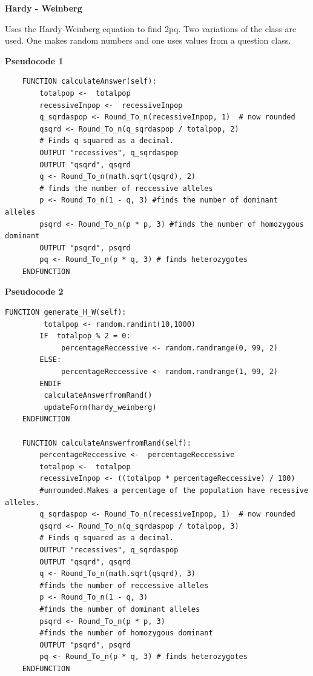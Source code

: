 \documentclass[a4paper,12pt]{report}
\begin{document}
\bigskip
\begin{flushleft}
\textbf{Hardy - Weinberg}

Uses the Hardy-Weinberg equation to find 2pq. Two variations of the class are used. One makes random numbers and one uses values from a question class. 
\end{flushleft}
\textbf{Pseudocode 1}
\begin{lstlisting}
    FUNCTION calculateAnswer(self):
        totalpop <-  totalpop
        recessiveInpop <-  recessiveInpop
        q_sqrdaspop <- Round_To_n(recessiveInpop, 1)  # now rounded
        qsqrd <- Round_To_n(q_sqrdaspop / totalpop, 2) 
        # Finds q squared as a decimal.
        OUTPUT "recessives", q_sqrdaspop
        OUTPUT "qsqrd", qsqrd
        q <- Round_To_n(math.sqrt(qsqrd), 2) 
        # finds the number of reccessive alleles
        p <- Round_To_n(1 - q, 3) #finds the number of dominant alleles
        psqrd <- Round_To_n(p * p, 3) #finds the number of homozygous dominant
        OUTPUT "psqrd", psqrd
        pq <- Round_To_n(p * q, 3) # finds heterozygotes
    ENDFUNCTION
\end{lstlisting}
\textbf{Pseudocode 2}
\begin{lstlisting}[style=customc]
    FUNCTION generate_H_W(self):
         totalpop <- random.randint(10,1000)
        IF  totalpop % 2 = 0:
             percentageReccessive <- random.randrange(0, 99, 2)
        ELSE:
             percentageReccessive <- random.randrange(1, 99, 2)
        ENDIF
         calculateAnswerfromRand()
         updateForm(hardy_weinberg)
    ENDFUNCTION

    FUNCTION calculateAnswerfromRand(self):        
        percentageReccessive <-  percentageReccessive
        totalpop <-  totalpop
        recessiveInpop <- ((totalpop * percentageReccessive) / 100)  
        #unrounded.Makes a percentage of the population have recessive alleles. 
        q_sqrdaspop <- Round_To_n(recessiveInpop, 1)  # now rounded
        qsqrd <- Round_To_n(q_sqrdaspop / totalpop, 3) 
        # Finds q squared as a decimal.
        OUTPUT "recessives", q_sqrdaspop
        OUTPUT "qsqrd", qsqrd
        q <- Round_To_n(math.sqrt(qsqrd), 3) 
        #finds the number of reccessive alleles
        p <- Round_To_n(1 - q, 3) 
        #finds the number of dominant alleles
        psqrd <- Round_To_n(p * p, 3) 
        #finds the number of homozygous dominant
        OUTPUT "psqrd", psqrd
        pq <- Round_To_n(p * q, 3) # finds heterozygotes
    ENDFUNCTION
\end{lstlisting}
\end{document}

